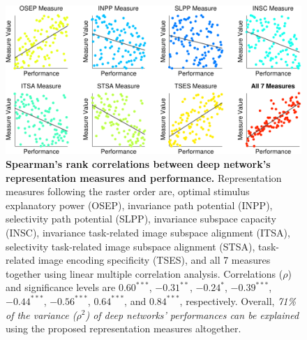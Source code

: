 \documentclass[10pt,twocolumn,letterpaper]{article}
\begin{document}
\begin{figure}
\begin{center}
\includegraphics[width=0.95\columnwidth]{Figs/e_fig7_scatter-crop.pdf} 
\end{center}
\caption{{\bf Spearman's rank correlations between deep network's representation measures and performance.}
Representation measures following the raster order are, optimal stimulus explanatory power (OSEP), invariance path potential (INPP), selectivity path potential (SLPP), invariance subspace capacity (INSC), invariance \vs task-related image subspace alignment (ITSA), selectivity \vs task-related image subspace alignment (STSA), task-related image encoding specificity (TSES), and all 7 measures together using linear multiple correlation analysis.
Correlations ($\rho$) and significance levels are $0.60^{\ast\ast\ast}$, $-0.31^{\ast\ast}$, $-0.24^{\ast}$, $-0.39^{\ast\ast\ast}$, $-0.44^{\ast\ast\ast}$, $-0.56^{\ast\ast\ast}$, $0.64^{\ast\ast\ast}$, and $0.84^{\ast\ast\ast}$, respectively.
Overall, \emph{71\% of the variance ($\rho^2$) of deep networks' performances can be explained} using the proposed representation measures altogether.
}
\label{fig:corr}
\end{figure}

\newcommand{\defvecpp}{Since no baseline can be defined for vector representations likewise, the invariance (and selectivity, similarly) path potential is redefined as path integral on the fitness landscape $\int_{0}^{\frac{\pi}{2}}{\exp\left(-\left\|f\left(\bf{x}^{+}_{\delta}\right)-f\left(\hat{\bf{x}}\right)\right\|\right)}\mathrm{d}\delta \mathbin{/} {\frac{\pi}{2}}$.}

\newcommand{\expinsc}{Vector representation's INSC is negatively correlated to network's performance, mainly due to the fact that poorer performing network's invariance paths are usually noisier (as depicted in Fig.~\ref{fig:align}D), and thus should be interpreted differently from scalar representation's INSC.}
\end{document}
